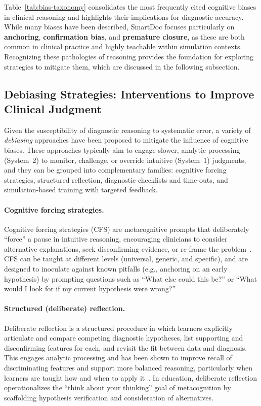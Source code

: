 \noindent Table~\ref{tab:bias-taxonomy} consolidates the most frequently cited
cognitive biases in clinical reasoning and highlights their implications for
diagnostic accuracy. While many biases have been described, SmartDoc focuses
particularly on \textbf{anchoring}, \textbf{confirmation bias}, and
\textbf{premature closure}, as these are both common in clinical practice and
highly teachable within simulation contexts. Recognizing these pathologies of
reasoning provides the foundation for exploring strategies to mitigate them,
which are discussed in the following subsection.



\subsection{Debiasing Strategies: Interventions to Improve Clinical Judgment}
\label{sec:debiasing}

Given the susceptibility of diagnostic reasoning to systematic error, a variety of \emph{debiasing} approaches have been proposed to mitigate the influence of cognitive biases. These approaches typically aim to engage slower, analytic processing (System~2) to monitor, challenge, or override intuitive (System~1) judgments, and they can be grouped into complementary families: cognitive forcing strategies, structured reflection, diagnostic checklists and time-outs, and simulation-based training with targeted feedback.

\paragraph{Cognitive forcing strategies.}
Cognitive forcing strategies (CFS) are metacognitive prompts that deliberately ``force'' a pause in intuitive reasoning, encouraging clinicians to consider alternative explanations, seek disconfirming evidence, or re-frame the problem~\parencite{croskerry_cfs_2003}. CFS can be taught at different levels (universal, generic, and specific), and are designed to inoculate against known pitfalls (e.g., anchoring on an early hypothesis) by prompting questions such as ``What else could this be?'' or ``What would I look for if my current hypothesis were wrong?''

\paragraph{Structured (deliberate) reflection.}
Deliberate reflection is a structured procedure in which learners explicitly articulate and compare competing diagnostic hypotheses, list supporting and disconfirming features for each, and revisit the fit between data and diagnosis. This engages analytic processing and has been shown to improve recall of discriminating features and support more balanced reasoning, particularly when learners are taught how and when to apply it~\parencite{mamede_reflection_review_2022,kuhn_teaching_reflection_2023, mamede_structure_2004}. In education, deliberate reflection operationalizes the ``think about your thinking'' goal of metacognition by scaffolding hypothesis verification and consideration of alternatives.

